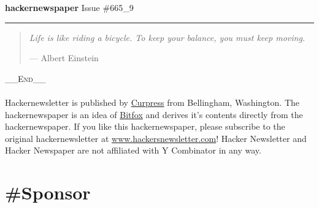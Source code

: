 \documentclass[10pt,a4paper]{article}
\begin{document}
\thispagestyle{empty}
\Huge {} 
\noindent\textbf{hacker{\color{red}news}paper}
\normalfont
\normalsize
\hfill Issue \#665\_9

{\noindent\color{red} \rule{\linewidth}{0.5mm}}

\begin{quotation}
    \textit{
Life is like riding a bicycle. To keep your balance, you must keep moving. } \par\hfill --- Albert Einstein

 
\end{quotation}

\tableofcontents

\noindent\color{gray}
\huge \textsc{\_\_End\_\_ } \\ \\ 
\small Hackernewsletter is published by \href{www.curpress.com}{Curpress} from Bellingham, Washington. The hackernewspaper is an idea of \href{www.bitfox.nl}{Bitfox} and derives it's contents directly from the hackernewspaper. If you like this hackernewspaper, please subscribe to the original hackernewsletter at \href{www.hackersnewsletter.com}{www.hackersnewsletter.com}! Hacker Newsletter and Hacker Newspaper are not affiliated with Y Combinator in any way.

\color{black}


\newpage
\pagestyle{fancy}

\section{\#Sponsor}
\end{document}
